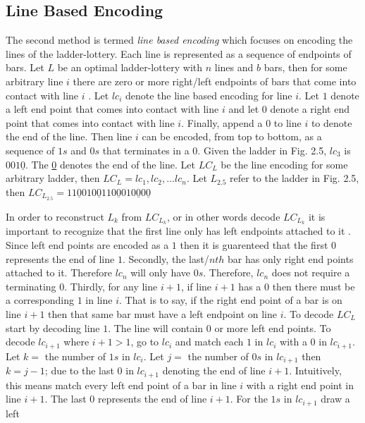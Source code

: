 \subsection{Line Based Encoding}
The second method is termed \emph{line based encoding} which focuses 
on encoding the lines of the ladder-lottery. Each line is represented 
as a sequence of endpoints of bars. Let $L$ be an optimal ladder-lottery 
with $n$ lines and $b$ bars, then for some arbitrary line $i$ there 
are zero or more right/left endpoints of bars that 
come into contact with line $i$ \cite{A5}. Let $lc_{i}$ denote the line based encoding for line $i$.
Let $1$ denote a left end point that 
comes into contact with line $i$ and let $0$ denote a right 
end point that comes into contact with line $i$. Finally, append a $0$
to line $i$ to denote the end of the line. Then line $i$ can be 
encoded, from top to bottom, as a sequence of $1s$ and $0s$ that 
terminates in a $0$.  Given the ladder in Fig. 2.5, 
$lc_{3}$ is $001\underline{0}$. The \underline{0} denotes 
the end of the line. Let $LC_{L}$ be the line encoding for 
some arbitrary ladder, then $LC_{L}=lc_{1}, lc_{2}, \dots lc_{n}$.
Let $L_{2.5}$ refer to the ladder in Fig. 2.5, then 
$LC_{L_{2.5}}=11\underline{0}010\underline{0}110\underline{0}010\underline{0}0\underline{0}$\par 
In order to reconstruct $L_{k}$ from $LC_{L_{k}}$, or in other words decode
$LC_{L_{k}}$ it is important to recognize that the first line only has left endpoints attached to it
\cite{A5}. Since left end points are encoded as a $1$ then it is guarenteed that the first $0$ 
represents the end of line $1$. Secondly, the last/$nth$ bar 
has only right end points attached to it.  Therefore $lc_{n}$ will only have $0s$. Therefore, $lc_{n}$
does not require a terminating $0$. Thirdly, for any 
line $i+1$, if line $i+1$ has a $0$ then there must be a corresponding $1$
in line $i$. That is to say, if the right end point of a bar is on line 
$i+1$ then that same bar must have a left endpoint on line $i$. To decode 
$LC_{L}$ start by decoding line $1$. The line will contain $0$ or more 
left end points. To decode $lc_{i+1}$ where $i+1>1$, go to 
$lc_{i}$ and match each $1$ in $lc_{i}$ with a $0$ in $lc_{i+1}$. 
Let $k=$ the number of $1s$ in $lc_{i}$. Let $j=$ the number 
of $0s$ in $lc_{i+1}$ then $k=j-1$; due to the last $0$ in $lc_{i+1}$ denoting 
the end of line $i+1$.  Intuitively, this means match every left end point 
of a bar in line $i$ with a right end point in line $i+1$. The last $0$
represents the end of line $i+1$. For the $1s$ in $lc_{i+1}$ draw a left 
